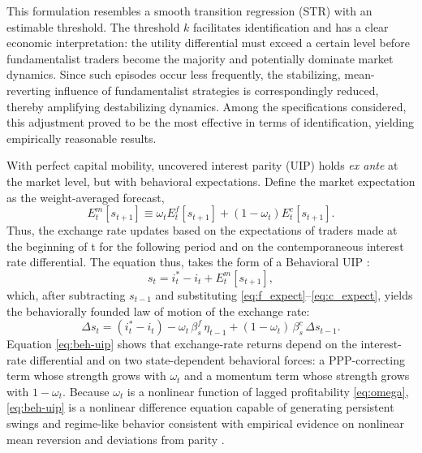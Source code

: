 \documentclass[a4paper,10pt,final]{article}    %
\begin{document}
This formulation resembles a smooth transition regression (STR) with an estimable threshold. The threshold $k$ facilitates identification and has a clear economic interpretation: the utility differential must exceed a certain level before fundamentalist traders become the majority and potentially dominate market dynamics. Since such episodes occur less frequently, the stabilizing, mean-reverting influence of fundamentalist strategies is correspondingly reduced, thereby amplifying destabilizing dynamics. Among the specifications considered, this adjustment proved to be the most effective in terms of identification, yielding empirically reasonable results.

With perfect capital mobility, uncovered interest parity (UIP) holds \emph{ex ante} at the market level, but with behavioral expectations. Define the market expectation as the weight-averaged forecast,
\begin{equation}
    E_t^{m}[s_{t+1}] \equiv \omega_t E_t^{f}[s_{t+1}] + (1-\omega_t) E_t^{c}[s_{t+1}].
    \label{eq:Em}
\end{equation}
Thus, the exchange rate updates based on the expectations of traders made at the beginning of t for the following period and on the contemporaneous interest rate differential. The equation thus, takes the form of a Behavioral UIP \citep{proano2013monetary}:
\begin{equation}
    s_t = i_t^{*}-i_t + E_t^{m}[s_{t+1}],
    \label{eq:uip_level}
\end{equation}
which, after subtracting $s_{t-1}$ and substituting \eqref{eq:f_expect}--\eqref{eq:c_expect}, yields the behaviorally founded law of motion of the exchange rate:
\begin{equation}
    \Delta s_t
    = (i_t^{*}-i_t)
    - \omega_t\,\beta_s^{f}\,\eta_{t-1}
    + (1-\omega_t)\,\beta_s^{c}\,\Delta s_{t-1}.
    \label{eq:beh-uip}
\end{equation}
Equation \eqref{eq:beh-uip} shows that exchange-rate returns depend on the interest-rate differential and on two state-dependent behavioral forces: a PPP-correcting term whose strength grows with $\omega_t$ and a momentum term whose strength grows with $1-\omega_t$. Because $\omega_t$ is a nonlinear function of lagged profitability \eqref{eq:omega}, \eqref{eq:beh-uip} is a nonlinear difference equation capable of generating persistent swings and regime-like behavior consistent with empirical evidence on nonlinear mean reversion and deviations from parity \citep{TaylorPeelSarno2001,DeGrauwe2006,MenkhoffTaylor2007}.
\end{document}
